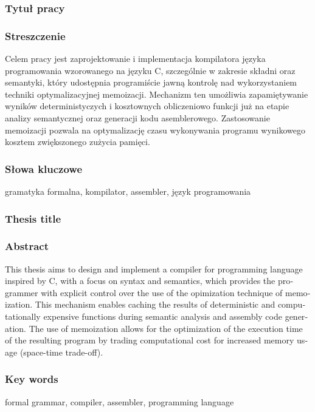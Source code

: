 \subsubsection*{Tytuł pracy} 
\Title

\subsubsection*{Streszczenie}  

Celem pracy jest zaprojektowanie i implementacja kompilatora języka programowania wzorowanego na języku C, szczególnie w zakresie składni oraz semantyki, który udostępnia programiście jawną kontrolę nad wykorzystaniem techniki optymalizacyjnej memoizacji. Mechanizm ten umożliwia zapamiętywanie wyników deterministyczych i kosztownych obliczeniowo funkcji już na etapie analizy semantycznej oraz generacji kodu asemblerowego. Zastosowanie memoizacji pozwala na optymalizację czasu wykonywania programu wynikowego kosztem zwiększonego zużycia pamięci.
\subsubsection*{Słowa kluczowe} 

gramatyka formalna, kompilator, assembler, język programowania

\subsubsection*{Thesis title} 
\begin{otherlanguage}{british}
\TitleAlt
\end{otherlanguage}

\subsubsection*{Abstract} 
\begin{otherlanguage}{british}

This thesis aims to design and implement a compiler for programming language inspired by C, with a focus on syntax and semantics, which provides the programmer with explicit control over the use of the opimization technique of memoization. This mechanism enables caching the results of deterministic and computationally expensive functions during semantic analysis and assembly code generation. The use of memoization allows for the optimization of the execution time of the resulting program by trading computational cost for increased memory usage (space-time trade-off).
\end{otherlanguage}
\subsubsection*{Key words}  
\begin{otherlanguage}{british}

formal grammar, compiler, assembler, programming language
\end{otherlanguage}

